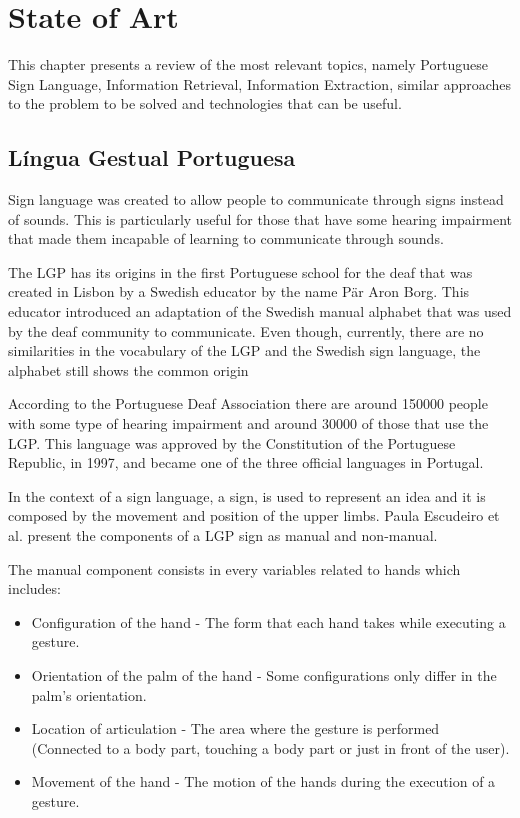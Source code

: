 
\chapter{State of Art}
\label{chap:Chapter2}

This chapter presents a review of the most relevant topics, namely Portuguese Sign Language, Information Retrieval, Information Extraction, similar approaches to the problem to be solved and technologies that can be useful.

\section{Língua Gestual Portuguesa}

Sign language was created to allow people to communicate through signs instead of sounds.
This is particularly useful for those that have some hearing impairment that made them incapable of learning to communicate through sounds.

The \gls{LGP} has its origins in the first Portuguese school for the deaf that was created in Lisbon by a Swedish educator by the name Pär Aron Borg.
This educator introduced an adaptation of the Swedish manual alphabet that was used by the deaf community to communicate.
Even though, currently, there are no similarities in the vocabulary of the \gls{LGP} and the Swedish sign language, the alphabet still shows the common origin\cite{oliveira2013tradutor}\cite{escudeiro2015virtual}

According to the Portuguese Deaf Association there are around 150000 people with some type of hearing impairment and around 30000 of those that use the \gls{LGP}\cite{gaspar2015if2lgp}.
This language was approved by the Constitution of the Portuguese Republic, in 1997, and became one of the three official languages in Portugal.

In the context of a sign language, a sign, is used to represent an idea and it is composed by the movement and position of the upper limbs.
Paula Escudeiro et al.\cite{escudeiro2015virtual} present the components of a \gls{LGP} sign as manual and non-manual.

The manual component consists in every variables related to hands which includes:
\begin{itemize}
        \item Configuration of the hand - The form that each hand takes while executing a gesture.
        \item Orientation of the palm of the hand - Some configurations only differ in the palm's orientation.
        \item Location of articulation - The area where the gesture is performed (Connected to a body part, touching a body part or just in front of the user).
        \item Movement of the hand - The motion of the hands during the execution of a gesture.
\end{itemize}

